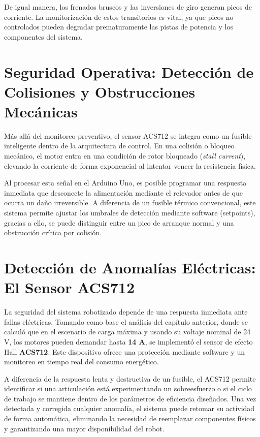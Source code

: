 De igual manera, los frenados bruscos y las inversiones de giro generan picos de corriente. La monitorización de estos transitorios es vital, ya que picos no controlados pueden degradar prematuramente las pistas de potencia y los componentes del sistema.



\section{Seguridad Operativa: Detección de Colisiones y Obstrucciones Mecánicas}

Más allá del monitoreo preventivo, el sensor ACS712 se integra como un fusible inteligente dentro de la arquitectura de control. En una colisión o bloqueo mecánico, el motor entra en una condición de rotor bloqueado (\textit{stall current}), elevando la corriente de forma exponencial al intentar vencer la resistencia física. 

Al procesar esta señal en el Arduino Uno, es posible programar una respuesta inmediata que desconecte la alimentación mediante el relevador antes de que ocurra un daño irreversible. A diferencia de un fusible térmico convencional, este sistema permite ajustar los umbrales de detección mediante software (setpoints), gracias a ello, se puede distinguir entre un pico de arranque normal y una obstrucción crítica por colisión.

\section{Detección de Anomalías Eléctricas: El Sensor ACS712}

La seguridad del sistema robotizado depende de una respuesta inmediata ante fallas eléctricas. Tomando como base el análisis del capítulo anterior, donde se calculó que en el escenario de carga máxima y usando su voltaje nominal de 24 V, los motores pueden demandar hasta \textbf{14 A}, se implementó el sensor de efecto Hall \textbf{ACS712}. Este dispositivo ofrece una protección mediante software y un monitoreo en tiempo real del consumo energético. 

A diferencia de la respuesta lenta y destructiva de un fusible, el ACS712 permite identificar si una articulación está experimentando un sobreesfuerzo o si el ciclo de trabajo se mantiene dentro de los parámetros de eficiencia diseñados. Una vez detectada y corregida cualquier anomalía, el sistema puede retomar su actividad de forma automática, eliminando la necesidad de reemplazar componentes físicos y garantizando una mayor disponibilidad del robot.

